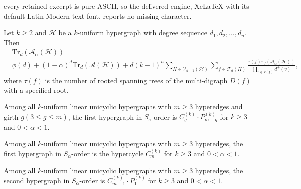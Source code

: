 \documentclass[10pt,a4paper]{amsart}
\begin{document}
every retained excerpt is pure ASCII, so the delivered engine, XeLaTeX with its default Latin Modern text font, reports no missing character.
\begin{thm}\label{T}
Let $k\ge2$ and $\mathcal{H}$ be a $k$-uniform hypergraph with degree sequence $d_1,d_2,\ldots,d_n$.
Then
\begin{equation*}
\begin{aligned}
&\mathrm{Tr}_{d}(\mathcal{A}_{\alpha}(\mathcal{H}))=\\& \phi(d)+(1-\alpha)^{d}\mathrm{Tr}_{d}(\mathcal{A}(\mathcal{H}))+d(k-1)^{n}\sum\limits_{H\in\mathcal{V}_{d-1}(\mathcal{H})}\sum\limits_{f\in\mathcal{F}_{d}(H)}\frac{\tau(f)\pi_{f}(\mathcal{A}_{\alpha}(\mathcal{H}))}{\prod\limits_{v\in V(f)}d^{+}(v)},
\end{aligned}
\end{equation*}
where $\tau(f)$ is the number of rooted spanning trees of the multi-digraph $D(f)$ with a specified root.
\end{thm}

\begin{thm}\label{cgpn-g}
Among all $k$-uniform linear unicyclic hypergraphs with $m\ge3$ hyperedges and girth $g(3\le g\le m)$, the first hypergraph in $S_{\alpha}$-order is $C_{g}^{(k)}\cdot P_{m-g}^{(k)}$ for $k\ge3$ and $0<\alpha<1$.
\end{thm}

\begin{thm}\label{firstcycle}
Among all $k$-uniform linear unicyclic hypergraphs with $m\ge3$ hyperedges, the first hypergraph in $S_{\alpha}$-order is the hypercycle $C_{m}^{(k)}$ for $k\ge3$ and $0<\alpha<1$.
\end{thm}

\begin{thm}
Among all $k$-uniform linear unicyclic hypergraphs with $m\ge3$ hyperedges, the second hypergraph in $S_{\alpha}$-order is $C_{m-1}^{(k)}\cdot P_{1}^{(k)}$ for $k\ge3$ and $0<\alpha<1$.
\end{thm}
\end{document}

